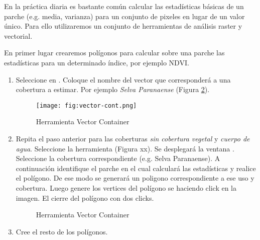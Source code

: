 En la práctica diaria es bastante común calcular las estadísticas básicas de un parche (e.g. media, varianza) para un conjunto de pixeles en lugar de un valor único. Para ello utilizaremos un conjunto de herramientas de análisis raster y vectorial.%

En primer lugar crearemos polígonos para calcular sobre una parche las estadísticas para un determinado índice, por ejemplo NDVI.

\begin{enumerate}
\item Seleccione en . Coloque el nombre del vector que corresponderá a una cobertura a estimar. Por ejemplo \emph{Selva Paranaense} (Figura \ref{fig:vector-container}).

\begin{figure}[h!]
    \centering
    \texttt{[image: fig:vector-cont.png]}
    \caption{Herramienta Vector Container}
    \label{fig:vector-container}
\end{figure}


\item Repita el paso anterior para las coberturas \emph{sin cobertura vegetal} y \emph{cuerpo de agua}. Seleccione la herramienta  (Figura xx). Se desplegará la ventana . Seleccione la cobertura correspondiente (e.g. Selva Paranaense). A continuación identifique el parche en el cual calculará las estadísticas y realice el polígono. De ese modo se generará un poligono correspondiente a ese uso y cobertura. Luego genere los vertices del polígono se haciendo click en la imagen. El cierre del polígono con dos clicks.

\begin{figure}[h!]
    \centering
    \caption{Herramienta Vector Container}
    \label{fig:vector-container}
\end{figure}

\item Cree el resto de los polígonos.
\end{enumerate}

%






